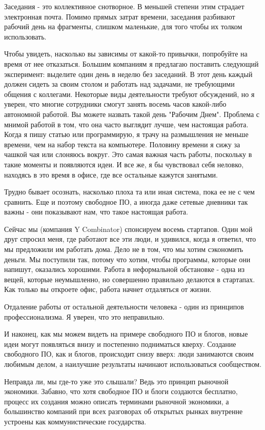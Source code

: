 \documentclass[ebook,12pt,oneside,openany]{memoir}
\begin{document}
Заседания - это коллективное снотворное. В меньшей степени этим
страдает электронная почта. Помимо прямых затрат времени, заседания
разбивают рабочий день на фрагменты, слишком маленькие, для того чтобы
их толком использовать.

Чтобы увидеть, насколько вы зависимы от какой-то привычки, попробуйте
на время от нее отказаться. Большим компаниям я предлагаю поставить
следующий эксперимент: выделите один день в неделю без заседаний. В
этот день каждый должен сидеть за своим столом и работать над
задачами, не требующими общения с коллегами. Некоторые виды
деятельности требуют обсуждений, но я уверен, что многие сотрудники
смогут занять восемь часов какой-либо автономной работой. Вы можете
назвать такой день "Рабочим Днем". Проблема с мнимой работой в том,
что она часто выглядит лучше, чем настоящая работа. Когда я пишу
статью или программирую, я трачу на размышления не меньше времени, чем
на набор текста на компьютере. Половину времени я сижу за чашкой чая
или слоняюсь вокруг. Это самая важная часть работы, поскольку в такие
моменты и появляются идеи. И все же, я бы чувствовал себя неловко,
находясь в это время в офисе, где все остальные кажутся занятыми.

Трудно бывает осознать, насколько плоха та или иная система, пока ее
не с чем сравнить. Еще и поэтому свободное ПО, а иногда даже сетевые
дневники так важны - они показывают нам, что такое настоящая работа.

Сейчас мы (компания Y Combinator) спонсируем восемь стартапов. Один
мой друг спросил меня, где работают все эти люди, и удивился, когда я
ответил, что мы предложили им работать дома. Дело не в том, что мы
хотим сэкономить деньги. Мы поступили так, потому что хотим, чтобы
программы, которые они напишут, оказались хорошими. Работа в
неформальной обстановке - одна из вещей, которые неумышленно, но
совершенно правильно делаются в стартапах. Как только вы откроете
офис, работа начнет отдаляться от жизни.

Отдаление работы от остальной деятельности человека - один из
принципов профессионализма. Я уверен, что это неправильно.

И наконец, как мы можем видеть на примере свободного ПО и блогов,
новые идеи могут появляться внизу и постепенно подниматься кверху.
Создание свободного ПО, как и блогов, происходит снизу вверх: люди
занимаются своим любимым делом, а наилучшие результаты начинают
использоваться сообществом.

Неправда ли, мы где-то уже это слышали? Ведь это принцип рыночной
экономики. Забавно, что хотя свободное ПО и блоги создаются бесплатно,
процесс их создания можно описать терминами рыночной экономики, а
большинство компаний при всех разговорах об открытых рынках внутренне
устроены как коммунистические государства.
\end{document}
